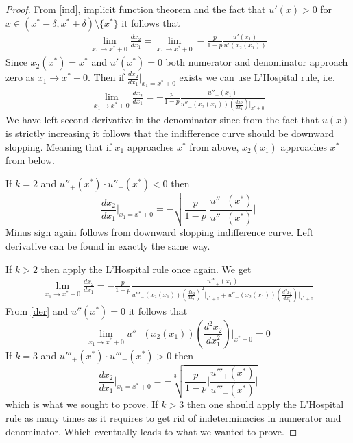 \documentclass[a4paper]{article}
\begin{document}
\begin{proof}
	From \eqref{ind}, implicit function theorem and the fact that $u'(x) > 0$ for $x \in (x^*-\delta, x^*+\delta)\setminus \{x^*\}$ it follows that
	\begin{align*}
		\lim_{x_1 \to x^*+0} \frac{dx_2}{dx_1} = \lim_{x_1 \to x^*+0} -\frac{p}{1-p} \frac{u'(x_1)}{u'(x_2(x_1))}
	\end{align*}
Since $x_2(x^*) = x^*$ and $u'(x^*) = 0$ both numerator and denominator approach zero as $x_1 \to x^*+0$. Then if $	\frac{d x_2}{d x_1} \bigg|_{x_1=x^*+0}$ exists we can use L'Hospital rule, i.e.
\begin{align*}
		\lim_{x_1 \to x^*+0} \frac{dx_2}{dx_1} = -\frac{p}{1-p} \frac{u''_{+}(x_1)}{u''_{-}(x_2(x_1)) \left(\frac{dx_2}{dx_1}\right)\bigg|_{x^*+0}}
	\end{align*}
We have left second derivative in the denominator since from the fact that $u(x)$ is strictly increasing it follows that the indifference curve should be downward slopping. Meaning that if $x_1$ approaches $x^*$ from above, $x_2(x_1)$ approaches $x^*$ from below.



If $k = 2$ and $u''_{+}(x^*) \cdot u''_{-}(x^*) < 0$ then $$	\frac{d x_2}{d x_1} \bigg|_{x_1=x^*+0} = -\sqrt{\frac{p}{1-p} \bigg|  \frac{u''_{+}(x^*)}{u''_{-}(x^*)} \bigg|  }$$
Minus sign again follows from downward slopping indifference curve. Left derivative can be found in exactly the same way.


If $k > 2$ then apply the L'Hospital rule once again. We get 
\begin{align*}
	\lim_{x_1 \to x^*+0} \frac{dx_2}{dx_1} = -\frac{p}{1-p} \frac{u'''_{+}(x_1)}{u'''_{-}(x_2(x_1)) \left(\frac{dx_2}{dx_1}\right)^2\bigg|_{x^*+0} + u''_{-}(x_2(x_1))\left(\frac{d^2x_2}{dx_1^2}\right)\bigg|_{x^*+0} }
\end{align*}
From \eqref{der} and $u''(x^*) = 0$ it follows that $$\lim_{x_1 \to x^*+0} u''_{-}(x_2(x_1))\left(\frac{d^2x_2}{dx_1^2}\right)\bigg|_{x^*+0} = 0$$
If $k = 3$ and $u'''_{+}(x^*) \cdot u'''_{-}(x^*) > 0$ then $$	\frac{d x_2}{d x_1} \bigg|_{x_1=x^*+0} = -\sqrt[3]{\frac{p}{1-p} \bigg|  \frac{u'''_{+}(x^*)}{u'''_{-}(x^*)} \bigg|  }$$
which is what we sought to prove. If $k>3$ then one should apply the L'Hospital rule as many times as it requires to get rid of indeterminacies in numerator and denominator. Which eventually leads to what we wanted to prove.
\end{proof}
\end{document}
